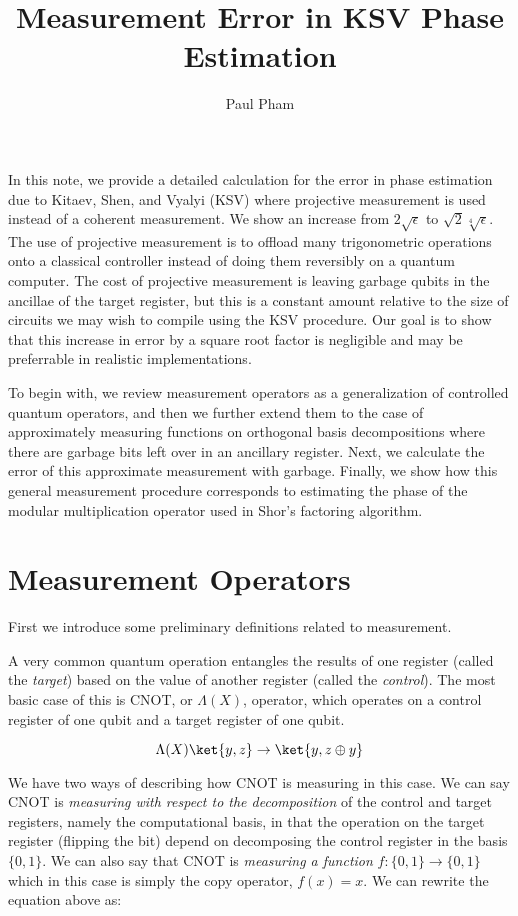 \documentclass{article}
\title{Measurement Error in KSV Phase Estimation}
\author{Paul Pham}
\begin{document}
\maketitle

In this note, we provide a detailed calculation for the error in
phase estimation due to Kitaev, Shen, and Vyalyi (KSV) where projective
measurement is used instead of a coherent measurement. We show an
increase from $2\sqrt{\epsilon}$ to $\sqrt{2}\sqrt[4]{\epsilon}$. The use
of projective measurement is to offload many trigonometric operations
onto a classical controller instead of doing them reversibly on a quantum
computer. The cost of projective measurement is leaving garbage qubits in
the ancillae of the target register, but this is a constant amount relative to
the size of circuits we may wish to compile using the KSV procedure.
Our goal is to show that this increase in error by a square root
factor is negligible and may be preferrable in realistic implementations.

To begin with, we review measurement operators as a generalization of
controlled quantum operators, and then we further extend them to the case
of approximately measuring functions on orthogonal basis decompositions
where there are garbage bits left over in an ancillary register.
Next, we calculate the error of this approximate measurement with garbage.
Finally, we show how this general measurement procedure corresponds to
estimating the phase of the modular multiplication operator used in
Shor's factoring algorithm.

\section{Measurement Operators}

First we introduce some preliminary definitions related to measurement.

A very common quantum operation entangles the results of one register
(called the \emph{target}) based on the value of another register (called the
\emph{control}). The most basic case of this is CNOT, or $\Lambda(X)$,
operator, which operates
on a control register of one qubit and a target register of one qubit.

\begin{equation}
\Lambda(X)\ket{y,z} \rightarrow \ket{y, z \oplus y}
\end{equation}

We have two ways of describing how CNOT is measuring in this case.
We can say CNOT is \emph{measuring with respect to the decomposition} of
the control and target registers, namely the computational basis, in that the
operation on the target register (flipping the bit) depend on decomposing the
control register in the basis $\{0,1\}$. We can also say that CNOT is
\emph{measuring a function} $f:\{0,1\} \rightarrow \{0,1\}$ which in this
case is simply the copy operator, $f(x) = x$. We can rewrite the equation
above as:
\end{document}
